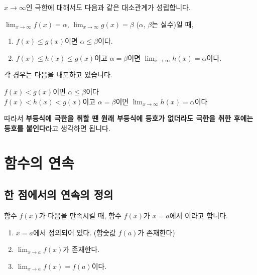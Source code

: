 $x\to \infty$인 극한에 대해서도 다음과 같은 대소관계가 성립합니다.
\begin{thmbox}
    $\lim_{x \to \infty} f\left( x \right) =\alpha$, $\lim_{x \to \infty} g\left( x \right) = \beta$ ($\alpha$, $\beta$는 실수)일 때,
   \begin{enumerate}[label={\onum*}]
       \item $f\left( x \right) \le g\left( x \right) $이면 $\alpha \le \beta$이다.
       \item $f\left( x \right) \le h\left( x \right) \le g\left( x \right) $이고 $\alpha=\beta$이면 $\lim_{x \to \infty}h\left( x \right) =\alpha$이다.
   \end{enumerate}
\end{thmbox}
각 경우는 다음을 내포하고 있습니다.\begin{center}
    $f\left( x \right) < g\left( x \right) $이면 $\alpha \le \beta$이다\\
    $f\left( x \right) < h\left( x \right) < g\left( x \right) $이고 $\alpha=\beta$이면 $\lim_{x \to \infty}h\left( x \right) =\alpha$이다
\end{center}따라서 \textbf{\color{cyan}부등식에 극한을 취할 땐 원래 부등식에 등호가 없더라도 극한을 취한 후에는 등호를 붙인다}라고 생각하면 됩니다.


\clearpage

\section{함수의 연속}
\subsection{한 점에서의 연속의 정의}
함수 $f\left( x \right) $가 다음을 만족시킬 때,  함수 $f\left( x \right) $가 $x=a$에서 이라고 합니다.
\begin{justbox}
\begin{enumerate}[label={\onum*}]
    \item $x=a$에서 정의되어 있다. (함숫값 $f\left( a \right) $가 존재한다)
    \item $\lim_{x \to a}f\left( x \right) $가 존재한다.
    \item $\lim_{x \to a}f\left( x \right) = f\left( a \right) $이다.
\end{enumerate}
\end{justbox}

